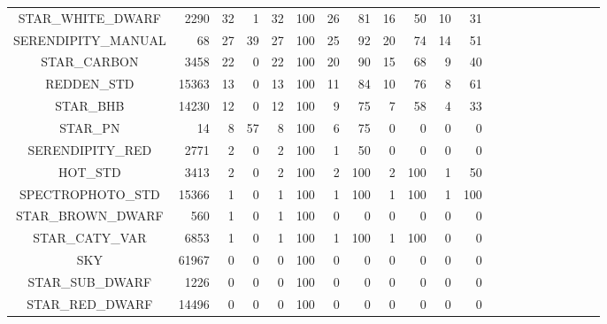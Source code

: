 \documentclass[onecolumn]{aa}
\begin{document}
\begin{table*}
\begin{center}
\begin{tabular}{c rrr rrr rrrrrrrrrrrrrr}
STAR\_WHITE\_DWARF & 2290 & 32 & 1 & 32 & 100 & 26 & 81 & 16 & 50 & 10 & 31 \\ 
SERENDIPITY\_MANUAL & 68 & 27 & 39 & 27 & 100 & 25 & 92 & 20 & 74 & 14 & 51 \\ 
STAR\_CARBON & 3458 & 22 & 0 & 22 & 100 & 20 & 90 & 15 & 68 & 9 & 40 \\ 
REDDEN\_STD & 15363 & 13 & 0 & 13 & 100 & 11 & 84 & 10 & 76 & 8 & 61 \\ 
STAR\_BHB & 14230 & 12 & 0 & 12 & 100 & 9 & 75 & 7 & 58 & 4 & 33 \\ 
STAR\_PN & 14 & 8 & 57 & 8 & 100 & 6 & 75 & 0 & 0 & 0 & 0 \\ 
SERENDIPITY\_RED & 2771 & 2 & 0 & 2 & 100 & 1 & 50 & 0 & 0 & 0 & 0 \\ 
HOT\_STD & 3413 & 2 & 0 & 2 & 100 & 2 & 100 & 2 & 100 & 1 & 50 \\ 
SPECTROPHOTO\_STD & 15366 & 1 & 0 & 1 & 100 & 1 & 100 & 1 & 100 & 1 & 100 \\ 
STAR\_BROWN\_DWARF & 560 & 1 & 0 & 1 & 100 & 0 & 0 & 0 & 0 & 0 & 0 \\ 
STAR\_CATY\_VAR & 6853 & 1 & 0 & 1 & 100 & 1 & 100 & 1 & 100 & 0 & 0 \\ 
SKY & 61967 & 0 & 0 & 0 & 100 & 0 & 0 & 0 & 0 & 0 & 0 \\ 
STAR\_SUB\_DWARF & 1226 & 0 & 0 & 0 & 100 & 0 & 0 & 0 & 0 & 0 & 0 \\ 
STAR\_RED\_DWARF & 14496 & 0 & 0 & 0 & 100 & 0 & 0 & 0 & 0 & 0 & 0 \\ 
\hline
\end{tabular}
\end{center}
\end{table*}
\end{document}
